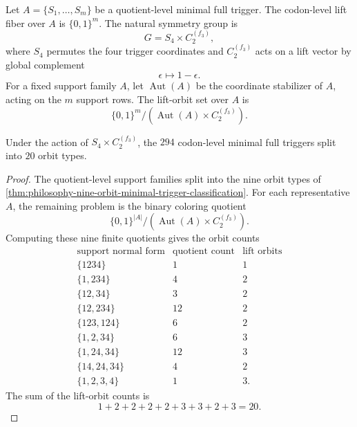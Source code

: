\begin{definition}
\label{def:philosophy-codon-level-lift-orbit}
Let $A=\{S_{1},\ldots,S_{m}\}$ be a quotient-level minimal full trigger.
The codon-level lift fiber over $A$ is $\{0,1\}^{m}$. The natural
symmetry group is
$$
  G=S_{4}\times C_{2}^{(f_{3})},
$$
where $S_{4}$ permutes the four trigger coordinates and $C_{2}^{(f_{3})}$
acts on a lift vector by global complement
$$
  \epsilon\longmapsto 1-\epsilon.
$$
For a fixed support family $A$, let $\operatorname{Aut}(A)$ be the
coordinate stabilizer of $A$, acting on the $m$ support rows. The
lift-orbit set over $A$ is
$$
  \{0,1\}^{m}/(\operatorname{Aut}(A)\times C_{2}^{(f_{3})}).
$$
\end{definition}

\begin{theorem}
\label{thm:philosophy-codon-level-lift-orbit-classification}
Under the action of $S_{4}\times C_{2}^{(f_{3})}$, the $294$
codon-level minimal full triggers split into $20$ orbit types.
\end{theorem}
\begin{proof}
The quotient-level support families split into the nine orbit types of
\autoref{thm:philosophy-nine-orbit-minimal-trigger-classification}.
For each representative $A$, the remaining problem is the binary
coloring quotient
$$
  \{0,1\}^{|A|}/(\operatorname{Aut}(A)\times C_{2}^{(f_{3})}).
$$
Computing these nine finite quotients gives the orbit counts
$$
\begin{array}{c|r|r}
  \text{support normal form} & \text{quotient count} & \text{lift orbits}\\
  \hline
  \{1234\} & 1 & 1\\
  \{1,234\} & 4 & 2\\
  \{12,34\} & 3 & 2\\
  \{12,234\} & 12 & 2\\
  \{123,124\} & 6 & 2\\
  \{1,2,34\} & 6 & 3\\
  \{1,24,34\} & 12 & 3\\
  \{14,24,34\} & 4 & 2\\
  \{1,2,3,4\} & 1 & 3.
\end{array}
$$
The sum of the lift-orbit counts is
$$
  1+2+2+2+2+3+3+2+3=20.
$$
\end{proof}

